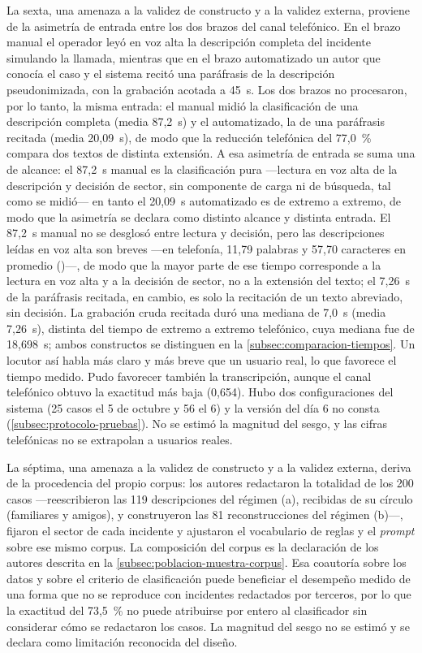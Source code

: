 La sexta, una amenaza a la validez de constructo y a la validez externa, proviene de la asimetría de entrada entre los dos brazos del canal telefónico. En el brazo manual el operador leyó en voz alta la descripción completa del incidente simulando la llamada, mientras que en el brazo automatizado un autor que conocía el caso y el sistema recitó una paráfrasis de la descripción pseudonimizada, con la grabación acotada a 45~s. Los dos brazos no procesaron, por lo tanto, la misma entrada: el manual midió la clasificación de una descripción completa (media 87,2~s) y el automatizado, la de una paráfrasis recitada (media 20,09~s), de modo que la reducción telefónica del 77,0~\% compara dos textos de distinta extensión. A esa asimetría de entrada se suma una de alcance: el 87,2~s manual es la clasificación pura ---lectura en voz alta de la descripción y decisión de sector, sin componente de carga ni de búsqueda, tal como se midió--- en tanto el 20,09~s automatizado es de extremo a extremo, de modo que la asimetría se declara como distinto alcance y distinta entrada. El 87,2~s manual no se desglosó entre lectura y decisión, pero las descripciones leídas en voz alta son breves ---en telefonía, 11,79 palabras y 57,70 caracteres en promedio ()---, de modo que la mayor parte de ese tiempo corresponde a la lectura en voz alta y a la decisión de sector, no a la extensión del texto; el 7,26~s de la paráfrasis recitada, en cambio, es solo la recitación de un texto abreviado, sin decisión. La grabación cruda recitada duró una mediana de 7,0~s (media 7,26~s), distinta del tiempo de extremo a extremo telefónico, cuya mediana fue de 18,698~s; ambos constructos se distinguen en la \autoref{subsec:comparacion-tiempos}. Un locutor así habla más claro y más breve que un usuario real, lo que favorece el tiempo medido. Pudo favorecer también la transcripción, aunque el canal telefónico obtuvo la exactitud más baja (0,654). Hubo dos configuraciones del sistema (25 casos el 5 de octubre y 56 el 6) y la versión del día 6 no consta (\autoref{subsec:protocolo-pruebas}). No se estimó la magnitud del sesgo, y las cifras telefónicas no se extrapolan a usuarios reales.

La séptima, una amenaza a la validez de constructo y a la validez externa, deriva de la procedencia del propio corpus: los autores redactaron la totalidad de los 200 casos ---reescribieron las 119 descripciones del régimen (a), recibidas de su círculo (familiares y amigos), y construyeron las 81 reconstrucciones del régimen (b)---, fijaron el sector de cada incidente y ajustaron el vocabulario de reglas y el \emph{prompt} sobre ese mismo corpus. La composición del corpus es la declaración de los autores descrita en la \autoref{subsec:poblacion-muestra-corpus}. Esa coautoría sobre los datos y sobre el criterio de clasificación puede beneficiar el desempeño medido de una forma que no se reproduce con incidentes redactados por terceros, por lo que la exactitud del 73,5~\% no puede atribuirse por entero al clasificador sin considerar cómo se redactaron los casos. La magnitud del sesgo no se estimó y se declara como limitación reconocida del diseño.

